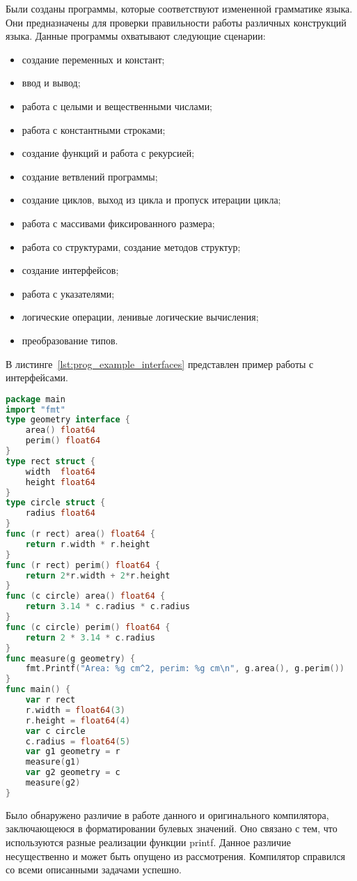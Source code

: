 Были созданы программы, которые соответствуют измененной грамматике языка.
Они предназначены для проверки правильности работы различных конструкций языка.
Данные программы охватывают следующие сценарии:
\begin{itemize}
	\item создание переменных и констант;
	\item ввод и вывод;
	\item работа с целыми и вещественными числами;
	\item работа с константными строками;
	\item создание функций и работа с рекурсией;
	\item создание ветвлений программы;
	\item создание циклов, выход из цикла и пропуск итерации цикла;
	\item работа с массивами фиксированного размера;
	\item работа со структурами, создание методов структур;
	\item создание интерфейсов;
	\item работа с указателями;
	\item логические операции, ленивые логические вычисления;
	\item преобразование типов.
\end{itemize}


В листинге~\ref{lst:prog_example_interfaces} представлен пример работы с интерфейсами.

\begin{lstlisting}[label=lst:prog_example_interfaces,language=go,basicstyle=\scriptsize,numberstyle=\tiny,caption={Пример программы использования интерфейсов}]
package main
import "fmt"
type geometry interface {
	area() float64
	perim() float64
}
type rect struct {
	width  float64
	height float64
}
type circle struct {
	radius float64
}
func (r rect) area() float64 {
	return r.width * r.height
}
func (r rect) perim() float64 {
	return 2*r.width + 2*r.height
}
func (c circle) area() float64 {
	return 3.14 * c.radius * c.radius
}
func (c circle) perim() float64 {
	return 2 * 3.14 * c.radius
}
func measure(g geometry) {
	fmt.Printf("Area: %g cm^2, perim: %g cm\n", g.area(), g.perim())
}
func main() {
	var r rect
	r.width = float64(3)
	r.height = float64(4)
	var c circle
	c.radius = float64(5)
	var g1 geometry = r
	measure(g1)
	var g2 geometry = c
	measure(g2)
}
\end{lstlisting}

Было обнаружено различие в работе данного и оригинального компилятора, заключающеюся в форматировании булевых значений.
Оно связано с тем, что используются разные реализации функции printf.
Данное различие несущественно и может быть опущено из рассмотрения.
Компилятор справился со всеми описанными задачами успешно.

